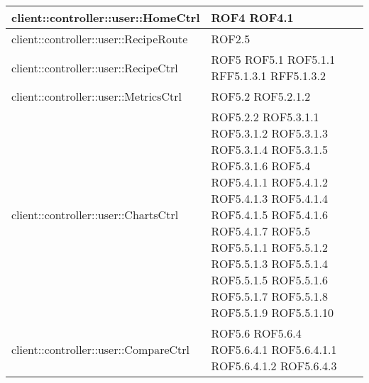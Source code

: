 \begin{center}
\begin{longtable}{| p{11cm} | p{2.5cm} |}
\hline
client::controller::user::HomeCtrl & ROF4 \newline ROF4.1 \\
\hline
client::controller::user::RecipeRoute & ROF2.5 \\
\hline
client::controller::user::RecipeCtrl & ROF5 \newline ROF5.1 \newline ROF5.1.1 \newline RFF5.1.3.1 \newline RFF5.1.3.2 \\
\hline
client::controller::user::MetricsCtrl & ROF5.2 \newline ROF5.2.1.2 \\
\hline
client::controller::user::ChartsCtrl & ROF5.2.2 \newline ROF5.3.1.1 \newline ROF5.3.1.2 \newline ROF5.3.1.3 \newline ROF5.3.1.4 \newline ROF5.3.1.5 \newline ROF5.3.1.6 \newline ROF5.4 \newline ROF5.4.1.1 \newline ROF5.4.1.2 \newline ROF5.4.1.3 \newline ROF5.4.1.4 \newline ROF5.4.1.5 \newline ROF5.4.1.6 \newline ROF5.4.1.7 \newline ROF5.5 \newline ROF5.5.1.1 \newline ROF5.5.1.2 \newline ROF5.5.1.3 \newline ROF5.5.1.4 \newline ROF5.5.1.5 \newline ROF5.5.1.6 \newline ROF5.5.1.7 \newline ROF5.5.1.8 \newline ROF5.5.1.9 \newline ROF5.5.1.10 \\
\hline
client::controller::user::CompareCtrl & ROF5.6 \newline ROF5.6.4 \newline ROF5.6.4.1 \newline ROF5.6.4.1.1 \newline ROF5.6.4.1.2 \newline ROF5.6.4.3 \\

\end{longtable}
\end{center}
